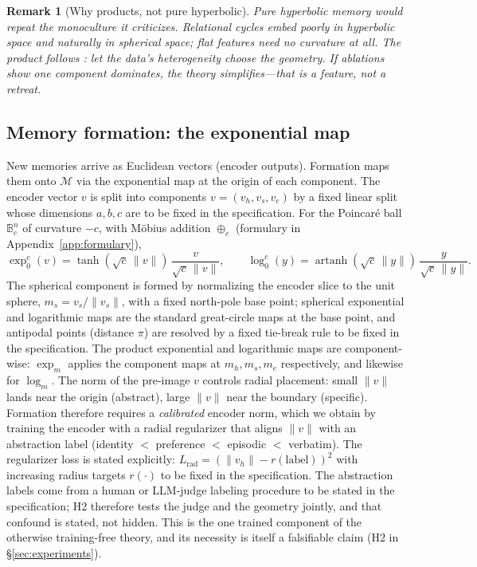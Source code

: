 \documentclass[11pt,a4paper]{article}
\newtheorem{remark}{Remark}
\newcommand{\M}{\mathcal{M}}
\newcommand{\B}{\mathbb{B}}
\begin{document}
\begin{remark}[Why products, not pure hyperbolic]
Pure hyperbolic memory would repeat the monoculture it criticizes.
Relational cycles embed poorly in hyperbolic space and naturally in
spherical space; flat features need no curvature at all. The product
follows \cite{gu2019}: let the data's heterogeneity choose the geometry.
If ablations show one component dominates, the theory simplifies---that
is a feature, not a retreat.
\end{remark}

\subsection{Memory formation: the exponential map}
\label{sec:formation}

New memories arrive as Euclidean vectors (encoder outputs). Formation maps
them onto $\M$ via the exponential map at the origin of each component.
The encoder vector $v$ is split into components $v = (v_h, v_s, v_e)$ by a
fixed linear split whose dimensions $a, b, c$ are to be fixed in the
specification. For the Poincar\'e ball $\B^n_{c}$ of curvature $-c$, with M\"obius
addition $\oplus_c$ (formulary in Appendix~\ref{app:formulary}),
\begin{equation}
\exp^c_0(v) = \tanh(\sqrt{c}\,\|v\|)\,\frac{v}{\sqrt{c}\,\|v\|},
\qquad
\log^c_0(y) = \operatorname{artanh}(\sqrt{c}\,\|y\|)\,\frac{y}{\sqrt{c}\,\|y\|}.
\end{equation}
The spherical component is formed by normalizing the encoder slice to the
unit sphere, $m_s = v_s / \|v_s\|$, with a fixed north-pole base point;
spherical exponential and logarithmic maps are the standard great-circle
maps at the base point, and antipodal points (distance $\pi$) are resolved
by a fixed tie-break rule to be fixed in the specification. The product
exponential and logarithmic maps are component-wise: $\exp_m$ applies the
component maps at $m_h, m_s, m_e$ respectively, and likewise for $\log_m$.
The norm of the pre-image $v$ controls radial placement: small $\|v\|$
lands near the origin (abstract), large $\|v\|$ near the boundary
(specific). Formation therefore requires a \emph{calibrated} encoder norm,
which we obtain by training the encoder with a radial regularizer that
aligns $\|v\|$ with an abstraction label (identity $<$ preference $<$
episodic $<$ verbatim). The regularizer loss is stated explicitly:
$L_{\mathrm{rad}} = (\|v_h\| - r(\mathrm{label}))^2$ with increasing radius
targets $r(\cdot)$ to be fixed in the specification. The abstraction labels come
from a human or LLM-judge labeling procedure to be stated in the specification;
H2 therefore tests the judge and the geometry jointly, and that confound
is stated, not hidden. This is the one trained component of the otherwise
training-free theory, and its necessity is itself a falsifiable claim
(H2 in \S\ref{sec:experiments}).
\end{document}
